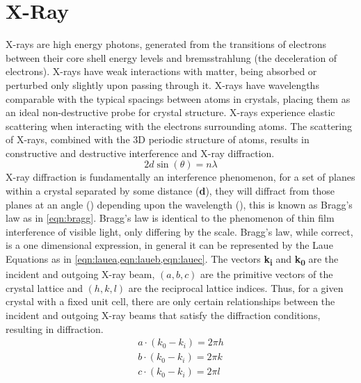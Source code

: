 \section{X-Ray}
X-rays are high energy photons, generated from the transitions of electrons between their core shell energy levels and bremsstrahlung (the deceleration of electrons).
X-rays have weak interactions with matter, being absorbed or perturbed only slightly upon passing through it.
X-rays have wavelengths comparable with the typical spacings between atoms in crystals, placing them as an ideal non-destructive probe for crystal structure.
X-rays experience elastic scattering when interacting with the electrons surrounding atoms.
The scattering of X-rays, combined with the 3D periodic structure of atoms, results in constructive and destructive interference and X-ray diffraction\cite{zavalij}.
\begin{equation}
 \label{eqn:bragg}
 2d \sin(\theta) = n \lambda
\end{equation}
X-ray diffraction is fundamentally an interference phenomenon, for a set of planes within a crystal separated by some distance (\textbf{d}), they will diffract from those planes at an angle (\textbf{\straighttheta}) depending upon the wavelength (\textbf{\textlambda{}}), this is known as Bragg's law as in \cref{eqn:bragg}.
Bragg's law is identical to the phenomenon of thin film interference of visible light, only differing by the scale.
Bragg's law, while correct, is a one dimensional expression, in general it can be represented by the Laue Equations as in \cref{eqn:lauea,eqn:laueb,eqn:lauec}.
The vectors \textbf{k\textsubscript{i}} and \textbf{k\textsubscript{0}} are the incident and outgoing X-ray beam, \((a,b,c)\) are the primitive vectors of the crystal lattice and \((h,k,l)\) are the reciprocal lattice indices.
Thus, for a given crystal with a fixed unit cell, there are only certain relationships between the incident and outgoing X-ray beams that satisfy the diffraction conditions, resulting in diffraction.
\begin{align}
 a \cdot (k_0 - k_i) = 2 \pi h \label{eqn:lauea} \\
 b \cdot (k_0 - k_i) = 2 \pi k \label{eqn:laueb} \\
 c \cdot (k_0 - k_i) = 2 \pi l \label{eqn:lauec}
\end{align}

